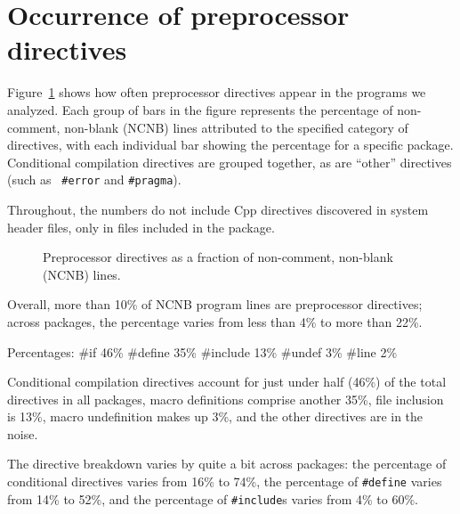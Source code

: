 \documentclass[11pt]{article}
\begin{document}
\section{Occurrence of preprocessor directives}
\label{sec:directives}

Figure~\ref{fig:directives-breakdown} shows how often preprocessor
directives appear in the programs we analyzed.  Each group of bars in the
figure represents the percentage of non-comment, non-blank (NCNB) lines
attributed to the specified category of directives, with each individual
bar showing the percentage for a specific package.  Conditional compilation
directives are grouped together, as are ``other'' directives (such as {\tt
\#error} and {\tt \#pragma}).  

Throughout, the numbers do not include Cpp directives discovered in system
header files, only in files included in the package.


\begin{figure}
\centerline{}
\caption{Preprocessor directives as a fraction of non-comment,
  non-blank (NCNB) lines.}
\label{fig:directives-breakdown}
\end{figure}

Overall, more than 10\% of NCNB program lines are preprocessor directives;
across packages, the percentage varies from less than 4\% to more than
22\%.


Percentages:
 \#if 46\%
 \#define 35\%
 \#include 13\%
 \#undef 3\%
 \#line 2\%

Conditional compilation directives account for just under half (46\%) of
the total directives in all packages, macro definitions comprise another
35\%, file inclusion is 13\%, macro undefinition makes up 3\%, and the
other directives are in the noise.

The directive breakdown varies by quite a bit across packages: the
percentage of conditional directives varies from 16\% to 74\%, the
percentage of {\tt \#define} varies from 14\% to 52\%, and the percentage of
{\tt \#include}s varies from 4\% to 60\%.
\end{document}
